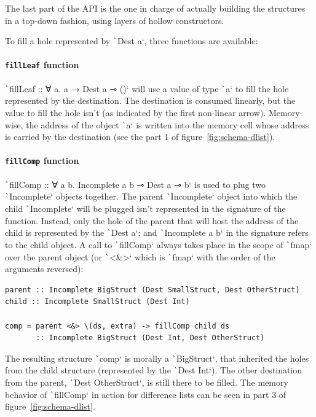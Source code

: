\documentclass[english]{jflart}
\begin{document}
The last part of the API is the one in charge of actually building the structures in a top-down fashion, using layers of hollow constructors. 

To fill a hole represented by \texttt`Dest a`, three functions are available:

\paragraph{\texttt{fillLeaf} function}

\texttt`fillLeaf :: ∀ a. a → Dest a ⊸ ()` will use a value of type \texttt`a` to fill the hole represented by the destination. The destination is consumed linearly, but the value to fill the hole isn't (as indicated by the first non-linear arrow). Memory-wise, the address of the object \texttt`a` is written into the memory cell whose address is carried by the destination (see the part 1 of figure~\ref{fig:schema-dlist}).

\paragraph{\texttt{fillComp} function}

\texttt`fillComp :: ∀ a b. Incomplete a b ⊸ Dest a ⊸ b` is used to plug two \texttt`Incomplete` objects together. The parent \texttt`Incomplete` object into which the child \texttt`Incomplete` will be plugged isn't represented in the signature of the function. Instead, only the hole of the parent that will host the address of the child is represented by the \texttt`Dest a`; and \texttt`Incomplete a b` in the signature refers to the child object. A call to \texttt`fillComp` always takes place in the scope of \texttt`fmap` over the parent object (or \texttt`<&>` which is \texttt`fmap` with the order of the arguments reversed):
{\small
\begin{verbatim}
parent :: Incomplete BigStruct (Dest SmallStruct, Dest OtherStruct)
child :: Incomplete SmallStruct (Dest Int)

comp = parent <&> \(ds, extra) -> fillComp child ds
       :: Incomplete BigStruct (Dest Int, Dest OtherStruct)
\end{verbatim}
}
The resulting structure \texttt`comp` is morally a \texttt`BigStruct`, that inherited the holes from the child structure (represented by the \texttt`Dest Int`). The other destination from the parent, \texttt`Dest OtherStruct`, is still there to be filled. The memory behavior of \texttt`fillComp` in action for difference lists can be seen in part 3 of figure~\ref{fig:schema-dlist}.
\end{document}
